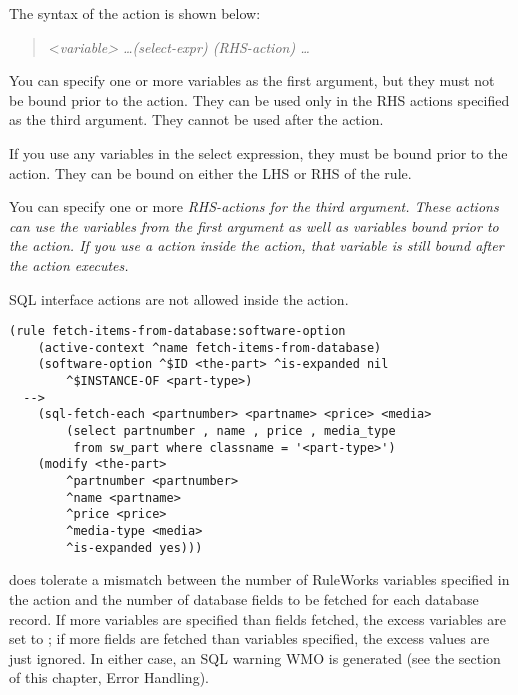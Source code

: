 The syntax of the  action is shown below:

\begin{quote}
   \co<\it{variable}\co> \ldots \co(\it{select-expr}\co)
  \co(\it{RHS-action}\co) \ldots
\end{quote}

You can specify one or more variables as the first argument, but they
must not be bound prior to the  action.  They can be
used only in the RHS actions specified as the third argument. They
cannot be used after the  action.

If you use any variables in the select expression, they must be bound
prior to the  action. They can be bound on either the
LHS or RHS of the rule.

You can specify one or more \it{RHS-actions} for the third
argument. These actions can use the variables from the first argument
as well as variables bound prior to the  action. If
you use a  action inside the  action, that
variable is still bound after the action executes.

SQL interface actions are not allowed inside the 
action.

\begin{exampl}
\begin{verbatim}
(rule fetch-items-from-database:software-option
    (active-context ^name fetch-items-from-database)
    (software-option ^$ID <the-part> ^is-expanded nil
        ^$INSTANCE-OF <part-type>)
  -->
    (sql-fetch-each <partnumber> <partname> <price> <media>
        (select partnumber , name , price , media_type
         from sw_part where classname = '<part-type>')
    (modify <the-part>
        ^partnumber <partnumber>
        ^name <partname>
        ^price <price>
        ^media-type <media>
        ^is-expanded yes)))
\end{verbatim}
\end{exampl}

 does tolerate a mismatch between the number of
RuleWorks variables specified in the action and the number of database
fields to be fetched for each database record. If more variables are
specified than fields fetched, the excess variables are set to
; if more fields are fetched than variables specified, the
excess values are just ignored. In either case, an SQL warning WMO is
generated (see the section of this chapter, Error Handling).

